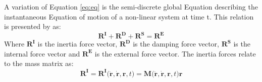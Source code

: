 \noindent A variation of Equation \ref{eq:eq} is the semi-discrete global Equation describing the instantaneous Equation of motion of a non-linear system at time t. This relation is presented by \cite{Mathisen1990} as:
\begin{equation}
    \boldsymbol{R^I}+ \boldsymbol{R^D} + \boldsymbol{R^S}=\boldsymbol{R^E}
\end{equation}
Where $\boldsymbol{R^I}$ is the inertia force vector, $\boldsymbol{R^D}$ is the damping force vector, $\boldsymbol{R^S}$ is the internal force vector and $\boldsymbol{R^E}$ is the external force vector. \newline
\newline
The inertia forces relate to the mass matrix as:
\begin{equation}
    \boldsymbol{R^I}= \boldsymbol{R^I(\ddot{r},\dot{r},r,}t)=\boldsymbol{M(\ddot{r},\dot{r},r,}t)\boldsymbol{r}
\end{equation}

